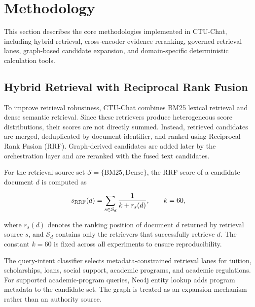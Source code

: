 \section{Methodology}
\label{sec:method}

This section describes the core methodologies implemented in CTU-Chat,
including hybrid retrieval, cross-encoder evidence reranking, governed
retrieval lanes, graph-based candidate expansion, and domain-specific
deterministic calculation tools.

\subsection{Hybrid Retrieval with Reciprocal Rank Fusion}

To improve retrieval robustness, CTU-Chat combines BM25 lexical retrieval and
dense semantic retrieval. Since these retrievers produce heterogeneous score
distributions, their scores are not directly summed. Instead, retrieved
candidates are merged, deduplicated by document identifier, and ranked using
Reciprocal Rank Fusion (RRF). Graph-derived candidates are added later by the
orchestration layer and are reranked with the fused text candidates.

For the retrieval source set
$\mathcal{S}=\{\text{BM25},\text{Dense}\}$,
the RRF score of a candidate document $d$ is computed as

\begin{equation}
  s_{\mathrm{RRF}}(d)
  =\sum_{s\in\mathcal{S}_d}\frac{1}{k+r_s(d)},
  \qquad k=60,
\label{eq:rrf}
\end{equation}

where $r_s(d)$ denotes the ranking position of document $d$ returned by retrieval source $s$, and $\mathcal{S}_d$ contains only the retrievers that successfully retrieve $d$. The constant $k=60$ is fixed across all experiments to ensure reproducibility.

The query-intent classifier selects metadata-constrained retrieval lanes for
tuition, scholarships, loans, social support, academic programs, and academic
regulations. For supported academic-program queries, Neo4j entity lookup adds
program metadata to the candidate set. The graph is treated as an expansion
mechanism rather than an authority source.

